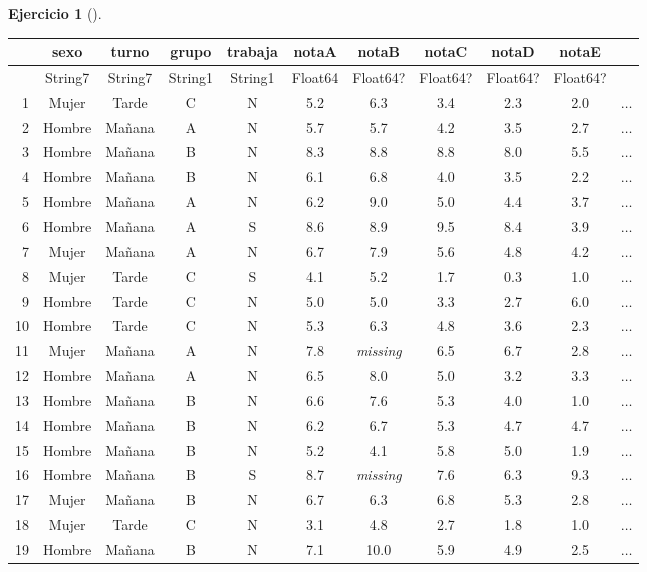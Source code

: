 \documentclass[
  a4paper,
]{scrreport}
\theoremstyle{definition}
\newtheorem{exercise}{Ejercicio}[chapter]
\theoremstyle{remark}
\begin{document}
\begin{exercise}[]
\begin{enumerate}
\begin{tcolorbox}
  \begin{tabular}{r|cccccccccc}
      & sexo & turno & grupo & trabaja & notaA & notaB & notaC & notaD & notaE & \\
      \hline
      & String7 & String7 & String1 & String1 & Float64 & Float64? & Float64? & Float64? & Float64? & \\
      \hline
      1 & Mujer & Tarde & C & N & 5.2 & 6.3 & 3.4 & 2.3 & 2.0 & $\dots$ \\
      2 & Hombre & Mañana & A & N & 5.7 & 5.7 & 4.2 & 3.5 & 2.7 & $\dots$ \\
      3 & Hombre & Mañana & B & N & 8.3 & 8.8 & 8.8 & 8.0 & 5.5 & $\dots$ \\
      4 & Hombre & Mañana & B & N & 6.1 & 6.8 & 4.0 & 3.5 & 2.2 & $\dots$ \\
      5 & Hombre & Mañana & A & N & 6.2 & 9.0 & 5.0 & 4.4 & 3.7 & $\dots$ \\
      6 & Hombre & Mañana & A & S & 8.6 & 8.9 & 9.5 & 8.4 & 3.9 & $\dots$ \\
      7 & Mujer & Mañana & A & N & 6.7 & 7.9 & 5.6 & 4.8 & 4.2 & $\dots$ \\
      8 & Mujer & Tarde & C & S & 4.1 & 5.2 & 1.7 & 0.3 & 1.0 & $\dots$ \\
      9 & Hombre & Tarde & C & N & 5.0 & 5.0 & 3.3 & 2.7 & 6.0 & $\dots$ \\
      10 & Hombre & Tarde & C & N & 5.3 & 6.3 & 4.8 & 3.6 & 2.3 & $\dots$ \\
      11 & Mujer & Mañana & A & N & 7.8 & \emph{missing} & 6.5 & 6.7 & 2.8 & $\dots$ \\
      12 & Hombre & Mañana & A & N & 6.5 & 8.0 & 5.0 & 3.2 & 3.3 & $\dots$ \\
      13 & Hombre & Mañana & B & N & 6.6 & 7.6 & 5.3 & 4.0 & 1.0 & $\dots$ \\
      14 & Hombre & Mañana & B & N & 6.2 & 6.7 & 5.3 & 4.7 & 4.7 & $\dots$ \\
      15 & Hombre & Mañana & B & N & 5.2 & 4.1 & 5.8 & 5.0 & 1.9 & $\dots$ \\
      16 & Hombre & Mañana & B & S & 8.7 & \emph{missing} & 7.6 & 6.3 & 9.3 & $\dots$ \\
      17 & Mujer & Mañana & B & N & 6.7 & 6.3 & 6.8 & 5.3 & 2.8 & $\dots$ \\
      18 & Mujer & Tarde & C & N & 3.1 & 4.8 & 2.7 & 1.8 & 1.0 & $\dots$ \\
      19 & Hombre & Mañana & B & N & 7.1 & 10.0 & 5.9 & 4.9 & 2.5 & $\dots$ \\

\end{tabular}
\end{tcolorbox}
\end{enumerate}
\end{exercise}
\end{document}
